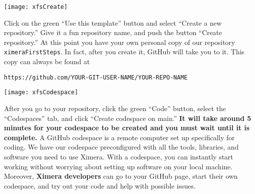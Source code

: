 \documentclass{ximera}
\begin{document}
\begin{image}
    \texttt{[image: xfsCreate]}
\end{image}
        Click on the green ``Use this template'' button and select ``Create a
        new repository.'' Give it a fun repository name, and push the button
        ``Create repository.''
        At this point you have your own personal copy of our repository
        \verb!ximeraFirstSteps!.
        In fact, after you create it, GitHub will take you to it. This copy can
        always
        be found at
        \begin{center}
            \verb!https://github.com/YOUR-GIT-USER-NAME/YOUR-REPO-NAME!
        \end{center}
        \newpage
        \pdfOnly{\end{multicols}}
\begin{image}
    \texttt{[image: xfsCodespace]}
\end{image}
        After you go to your repository, click the green ``Code'' button, select the ``Codespaces''
        tab, and click ``Create codespace on main.'' \textbf{It will take
            around 5
            minutes for your codespace to be created and you must wait until it
            is
            complete.} A GitHub codespace is a remote computer set up
        specifically for
        coding. We have our codespace preconfigured with all the tools,
        libraries, and
        software you need to use Ximera. With a codespace, you can instantly
        start
        working without worrying about setting up software on your local
        machine.
        Moreover, \textbf{Ximera developers} can go to your GitHub page, start
        their
        own codespace, and try out your code and help with possible issues.

        \pdfOnly{\end{multicols*}}

\newpage
\end{document}
